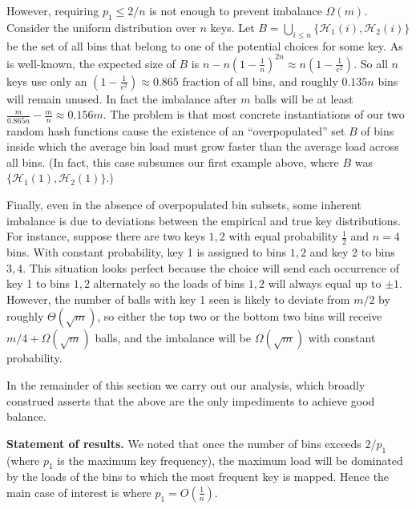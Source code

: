 \documentclass[10pt,conference,letterpaper]{IEEEtran}
\newcommand{\spara}[1]{\smallskip\noindent\textbf{#1}}
\newcommand{\hash}[1]{\ensuremath{\mathcal{H}_{#1}}\xspace}
\begin{document}
However, requiring $p_1 \le 2 / n$ is not enough to prevent imbalance $\Omega(m)$. Consider the uniform distribution
over $n$ keys. Let $B = \bigcup_{i \le n} \{ \hash{1}(i), \hash{2}(i) \}$ be the set of all bins that belong to one of the potential choices for some key. 
As is well-known, the expected size of $B$ is $n - n \left(1 - \frac{1}{n}\right)^{2n} \approx n (1 -
    \frac{1}{e^2})$. So all $n$ keys use only an $(1-\frac{1}{e^2}) \approx 0.865$ fraction of all
bins, and roughly $0.135 n$ bins will remain unused. In fact the imbalance after $m$ balls
will be at least $\frac{m}{0.865 n}-\frac{m}{n} \approx 0.156 m$.
The problem is that most concrete instantiations of our two random hash functions cause the existence of
an ``overpopulated'' set $B$ of bins inside which
the average bin load must grow faster than the average load across all bins.
(In fact, this case subsumes our first example above, where $B$ was $\{ \hash{1}(1), \hash{2}(1) \}$.)


Finally, even in the absence of overpopulated bin subsets, some inherent imbalance
is     due to deviations between the empirical and true key distributions.
For instance, suppose there are two
keys $1, 2$ with equal probability $\frac12$ and $n =4$ bins. With constant probability, key 1 is assigned to bins $1, 2$
and key 2 to bins $3, 4$. This situation looks perfect because the  choice will send each
occurrence of key 1 to bins $1,2$ alternately so the loads of bins $1, 2$ will always equal up to $\pm 1$.
However, the number of balls with key 1 seen is likely to deviate from $m/2$ by roughly $\Theta(\sqrt m)$, so either the top two or the bottom two bins will receive
$m / 4 + \Omega(\sqrt m)$ balls, and the imbalance will be $\Omega(\sqrt m)$ with constant probability.

In the remainder of this section we carry out our analysis, which broadly construed asserts that the above are the only impediments to achieve good balance. 

\spara{Statement of results.}
We  noted  that once the number of bins exceeds $2/p_1$ (where $p_1$ is the maximum key
frequency), the maximum load will be dominated by the loads of the bins to which the most frequent key is mapped. 
Hence the main case of interest is where $p_1 = O(\frac{1}{n})$.
\end{document}
